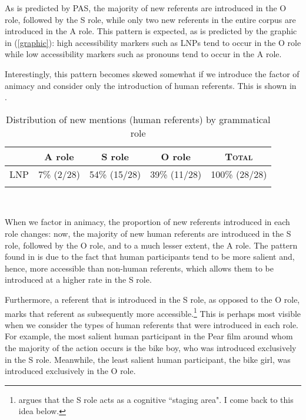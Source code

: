 As is predicted by PAS, the majority of new referents are introduced in the O role, followed by the S role, while only two new referents in the entire corpus are introduced in the A role. This pattern is expected, as is predicted by the graphic in (\ref{graphic}): high accessibility markers such as LNPs tend to occur in the O role while low accessibility markers such as pronouns tend to occur in the A role.

Interestingly, this pattern becomes skewed somewhat if we introduce the factor of animacy and consider only the introduction of human referents. This is shown in .
\begin{table} 

\caption{{Distribution of new mentions (human referents) by grammatical role}}
\begin{tabular}{| r  c  c  c  c }
\lsptoprule
 & A role & S role & O role & \textsc{Total} \\

\midrule
 \textsc{LNP} & 7{\%} (2/28) & 54{\%} (15/28) & 39{\%} (11/28) & 100{\%} (28/28) \\

\lspbottomrule
\end{tabular}\\
\label{newhumanreferents}

\end{table}
When we factor in animacy, the proportion of new referents introduced in each role changes: now, the majority of new human referents are introduced in the S role, followed by the O role, and to a much lesser extent, the A role. The pattern found in  is due to the fact that human participants tend to be more salient and, hence, more accessible than non-human referents, which allows them to be introduced at a higher rate in the S role. 

Furthermore, a referent that is introduced in the S role, as opposed to the O role, marks that referent as subsequently more accessible.\footnote{\citet[831]{dubois1987} argues that the S role acts as a cognitive ``staging area". I come back to this idea below.} This is perhaps most visible when we consider the types of human referents that were introduced in each role. For example, the most salient human participant in the Pear film around whom the majority of the action occurs is the bike boy, who was introduced exclusively in the S role. Meanwhile, the least salient human participant, the bike girl, was introduced exclusively in the O role. 


